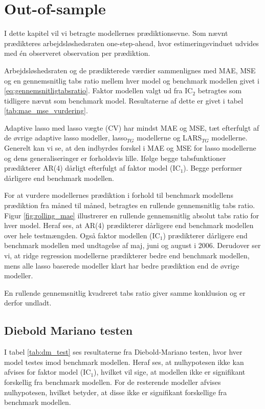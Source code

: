 \chapter{Out-of-sample} \label{ch:out-of-sample}
I dette kapitel vil vi betragte modellernes prædiktionsevne.
Som nævnt prædikteres arbejdsløshedsraten one-step-ahead, hvor estimeringsvinduet udvides med én observeret observation per prædiktion.

Arbejdsløshedsraten og de prædikterede værdier sammenlignes med MAE, MSE og en gennemsnitlig tabs ratio mellem hver model og benchmark modellen givet i \eqref{eq:gennemsnitligtabsratio}.
Faktor modellen valgt ud fra IC\(_2\) betragtes som tidligere nævnt som benchmark model.
Resultaterne af dette er givet i tabel \ref{tab:mae_mse_vurdering}.



Adaptive lasso med lasso vægte (CV) har mindst MAE og MSE, tæt efterfulgt af de øvrige adaptive lasso modeller, lasso\(_{TG}\) modellerne og LARS\(_{TG}\) modellerne.
Generelt kan vi se, at den indbyrdes forskel i MAE og MSE for lasso modellerne og dens generaliseringer er forholdsvis lille.
Ifølge begge tabsfunktioner prædikterer AR(4) dårligt efterfulgt af faktor model (IC\(_1\)).
Begge performer dårligere end benchmark modellen.

For at vurdere modellernes prædiktion i forhold til benchmark modellens prædiktion fra måned til måned, betragtes en rullende gennemsnitlig tabs ratio.
Figur \ref{fig:rolling_mae} illustrerer en rullende gennemsnitlig absolut tabs ratio for hver model. 
Heraf ses, at AR(4) prædikterer dårligere end benchmark modellen over hele testmængden.
Også faktor modellen (IC\(_1\)) prædikterer dårligere end benchmark modellen med undtagelse af maj, juni og august i 2006.
Derudover ser vi, at ridge regression modellerne prædikterer bedre end benchmark modellen, mens alle lasso baserede modeller klart har bedre prædiktion end de øvrige modeller.
%

En rullende gennemsnitlig kvadreret tabs ratio giver samme konklusion og er derfor undladt.


\section{Diebold Mariano testen}
I tabel \ref{tab:dm_test} ses resultaterne fra Diebold-Mariano testen, hvor hver model testes imod benchmark modellen.
Heraf ses, at nulhypotesen ikke kan afvises for faktor model (IC\(_1\)), hvilket vil sige, at modellen ikke er signifikant forskellig fra benchmark modellen.
For de resterende modeller afvises nulhypotesen, hvilket betyder, at disse ikke er signifikant forskellige fra benchmark modellen.
%

%
\newpage
